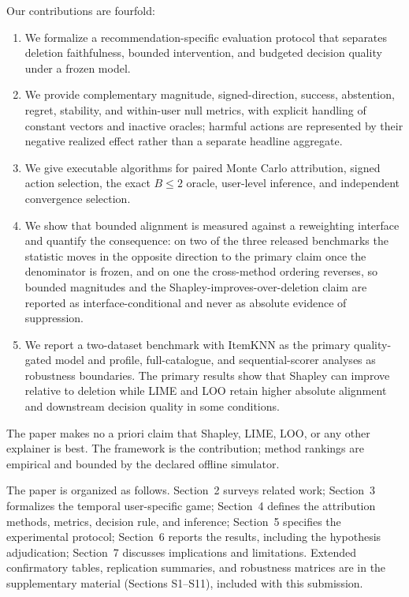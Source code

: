 \documentclass[manuscript,screen,review,anonymous]{acmart}
\begin{document}
Our contributions are fourfold:
\begin{enumerate}
  \item We formalize a recommendation-specific evaluation protocol that separates deletion faithfulness, bounded intervention, and budgeted decision quality under a frozen model.
  \item We provide complementary magnitude, signed-direction, success, abstention, regret, stability, and within-user null metrics, with explicit handling of constant vectors and inactive oracles; harmful actions are represented by their negative realized effect rather than a separate headline aggregate.
  \item We give executable algorithms for paired Monte Carlo attribution, signed action selection, the exact $B\le2$ oracle, user-level inference, and independent convergence selection.
  \item We show that bounded alignment is measured against a reweighting interface and quantify the consequence: on two of the three released benchmarks the statistic moves in the opposite direction to the primary claim once the denominator is frozen, and on one the cross-method ordering reverses, so bounded magnitudes and the Shapley-improves-over-deletion claim are reported as interface-conditional and never as absolute evidence of suppression.
  \item We report a two-dataset benchmark with ItemKNN as the primary quality-gated model and profile, full-catalogue, and sequential-scorer analyses as robustness boundaries. The primary results show that Shapley can improve relative to deletion while LIME and LOO retain higher absolute alignment and downstream decision quality in some conditions.
\end{enumerate}

The paper makes no a priori claim that Shapley, LIME, LOO, or any other explainer is best. The framework is the contribution; method rankings are empirical and bounded by the declared offline simulator.



The paper is organized as follows. Section~2 surveys related work; Section~3 formalizes the temporal user-specific game; Section~4 defines the attribution methods, metrics, decision rule, and inference; Section~5 specifies the experimental protocol; Section~6 reports the results, including the hypothesis adjudication; Section~7 discusses implications and limitations. Extended confirmatory tables, replication summaries, and robustness matrices are in the supplementary material (Sections S1--S11), included with this submission.
\end{document}
